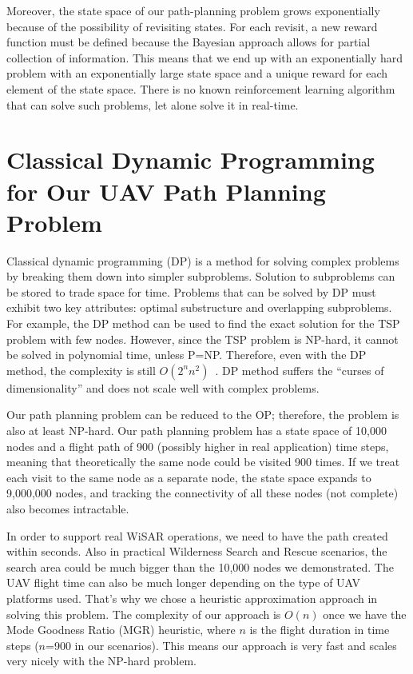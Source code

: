 Moreover, the state space of our path-planning problem grows exponentially because of the possibility of revisiting states. For each revisit, a new reward function must be defined because the Bayesian approach allows for partial collection of information.  This means that we end up with an exponentially hard problem with an exponentially large state space and a unique reward for each element of the state space.  There is no known reinforcement learning algorithm that can solve such problems, let alone solve it in real-time.

\section{Classical Dynamic Programming for Our UAV Path Planning Problem}
\label{CDPUAV}

Classical dynamic programming (DP) is a method for solving complex problems by breaking them down into simpler subproblems. Solution to subproblems can be stored to trade space for time. Problems that can be solved by DP must exhibit two key attributes: optimal substructure and overlapping subproblems. For example, the DP method can be used to find the exact solution for the TSP problem with few nodes. However, since the TSP problem is NP-hard, it cannot be solved in polynomial time, unless P=NP. Therefore, even with the DP method, the complexity is still $O(2^n n^2)$~\cite{Bellman1958Combinatorial}. DP method suffers the ``curses of dimensionality'' and does not scale well with complex problems.

Our path planning problem can be reduced to the OP; therefore, the problem is also at least NP-hard. Our path planning problem has a state space of 10,000 nodes and a flight path of 900 (possibly higher in real application) time steps, meaning that theoretically the same node could be visited 900 times. If we treat each visit to the same node as a separate node, the state space expands to 9,000,000 nodes, and tracking the connectivity of all these nodes (not complete) also becomes intractable.

In order to support real WiSAR operations, we need to have the path created within seconds. Also in practical Wilderness Search and Rescue scenarios, the search area could be much bigger than the 10,000 nodes we demonstrated. The UAV flight time can also be much longer depending on the type of UAV platforms used. That's why we chose a heuristic approximation approach in solving this problem. The complexity of our approach is $O(n)$ once we have the Mode Goodness Ratio (MGR) heuristic, where $n$ is the flight duration in time steps ($n$=900 in our scenarios). This means our approach is very fast and scales very nicely with the NP-hard problem.


